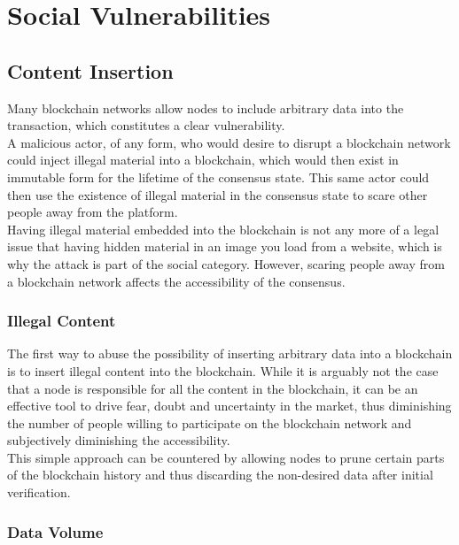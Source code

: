\documentclass[12pt,a4paper]{article}
\begin{document}
\section{Social Vulnerabilities}

\subsection{Content Insertion}

Many blockchain networks allow nodes to include arbitrary data into the transaction, which constitutes a clear vulnerability.\\

A malicious actor, of any form, who would desire to disrupt a blockchain network could inject illegal material into a blockchain, which would then exist in immutable form for the lifetime of the consensus state. This same actor could then use the existence of illegal material in the consensus state to scare other people away from the platform.\\

Having illegal material embedded into the blockchain is not any more of a legal issue that having hidden material in an image you load from a website, which is why the attack is part of the social category. However, scaring people away from a blockchain network affects the accessibility of the consensus.\\

\subsubsection{Illegal Content}

The first way to abuse the possibility of inserting arbitrary data into a blockchain is to insert illegal content into the blockchain. While it is arguably not the case that a node is responsible for all the content in the blockchain, it can be an effective tool to drive fear, doubt and uncertainty in the market, thus diminishing the number of people willing to participate on the blockchain network and subjectively diminishing the accessibility.\\

This simple approach can be countered by allowing nodes to prune certain parts of the blockchain history and thus discarding the non-desired data after initial verification.\\

\subsubsection{Data Volume}
\end{document}
